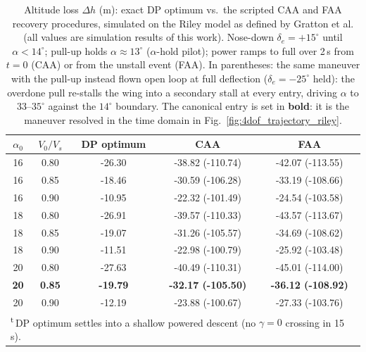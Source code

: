 \begin{table}[!ht]
    \centering
    \caption{Altitude loss $\Delta h$ (m): exact DP optimum vs.\ the scripted CAA and FAA recovery procedures, simulated on the Riley model as defined by Gratton et al. (all values are simulation results of this work). Nose-down $\delta_e=+15^\circ$ until $\alpha<14^\circ$; pull-up holds $\alpha\approx13^\circ$ ($\alpha$-hold pilot); power ramps to full over 2\,s from $t=0$ (CAA) or from the unstall event (FAA). In parentheses: the same maneuver with the pull-up instead flown open loop at full deflection ($\delta_e=-25^\circ$ held): the overdone pull re-stalls the wing into a secondary stall at every entry, driving $\alpha$ to $33$--$35^\circ$ against the $14^\circ$ boundary. The canonical entry is set in \textbf{bold}: it is the maneuver resolved in the time domain in Fig.~\ref{fig:4dof_trajectory_riley}.}
    \label{tab:maneuvers}
    \begin{tabular}{ccccc}
        \hline
        $\alpha_0$ & $V_0/V_s$ & DP optimum & CAA & FAA \\
        \hline
        16 & 0.80 & -26.30 & -38.82 (-110.74) & -42.07 (-113.55) \\
        16 & 0.85 & -18.46 & -30.59 (-106.28) & -33.19 (-108.66) \\
        16 & 0.90 & -10.95 & -22.32 (-101.49) & -24.54 (-103.58) \\
        18 & 0.80 & -26.91 & -39.57 (-110.33) & -43.57 (-113.67) \\
        18 & 0.85 & -19.07 & -31.26 (-105.57) & -34.69 (-108.62) \\
        18 & 0.90 & -11.51 & -22.98 (-100.79) & -25.92 (-103.48) \\
        20 & 0.80 & -27.63 & -40.49 (-110.31) & -45.01 (-114.00) \\
        \bfseries 20 & \bfseries 0.85 & \bfseries -19.79 & \bfseries -32.17 (-105.50) & \bfseries -36.12 (-108.92) \\
        20 & 0.90 & -12.19 & -23.88 (-100.67) & -27.33 (-103.76) \\
        \hline
        \multicolumn{5}{l}{\footnotesize\textsuperscript{t}\,DP optimum settles into a shallow powered descent (no $\gamma=0$ crossing in 15\,s).}\\
    \end{tabular}
\end{table}
